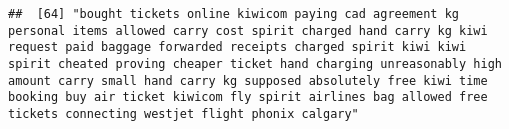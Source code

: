 \documentclass[
]{article}
\begin{document}
\begin{verbatim}
##  [64] "bought tickets online kiwicom paying cad agreement kg personal items allowed carry cost spirit charged hand carry kg kiwi request paid baggage forwarded receipts charged spirit kiwi kiwi spirit cheated proving cheaper ticket hand charging unreasonably high amount carry small hand carry kg supposed absolutely free kiwi time booking buy air ticket kiwicom fly spirit airlines bag allowed free tickets connecting westjet flight phonix calgary"                                                                                                                                                                                                                                                                                                                                                                                                                                                                                                                                                                                                                                                                                                                                                                                                                                                                                                                                                                                                                                                                                                                                                                                                                                                                                                                                     

\end{verbatim}
\end{document}
